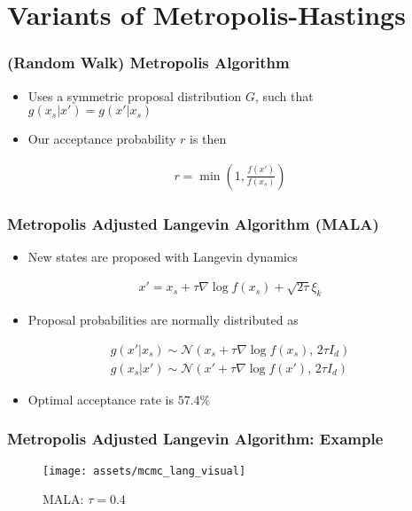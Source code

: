 \documentclass{beamer}
\begin{document}
\section{Variants of Metropolis-Hastings}
\begin{frame}
  \frametitle{(Random Walk) Metropolis Algorithm}
  \begin{itemize}
    \item Uses a symmetric proposal distribution $G$, such that \\
    $g(x_s|x') = g(x'|x_s)$
    \item Our acceptance probability $r$ is then
  \end{itemize}
  \begin{gather*}
    r = \min \left(1 , \frac{f(x')}{f(x_s)} \right)
  \end{gather*}
\end{frame}

\begin{frame}
  \frametitle{Metropolis Adjusted Langevin Algorithm (MALA)}
  \begin{itemize}
    \item New states are proposed with Langevin dynamics
  \end{itemize}
  \begin{gather*}
      x' = x_s + \tau \nabla \log f(x_s) + \sqrt{2 \tau} \xi_k
  \end{gather*}
  \begin{itemize}
    \item Proposal probabilities are normally distributed as
  \end{itemize}
  \begin{gather*}
    g(x'| x_s) \sim \mathcal{N}(x_s + \tau \nabla \log f(x_s), \, 2 \tau  I_d) \\
    g(x_s | x') \sim \mathcal{N}(x' + \tau \nabla \log f(x'), \, 2 \tau  I_d)
  \end{gather*}
  \begin{itemize}
    \item Optimal acceptance rate is $57.4\%$
  \end{itemize}
\end{frame}

\begin{frame}
  \frametitle{Metropolis Adjusted Langevin Algorithm: Example}
  \begin{figure}
    \centering
    \texttt{[image: assets/mcmc\_lang\_visual]}
    \caption{MALA: $\tau=0.4$}
  \end{figure}
\end{frame}
\end{document}
